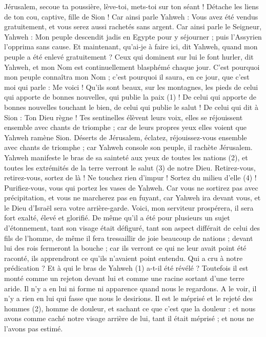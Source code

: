 \begin{multicols}{2}
{Jérusalem, secoue ta poussière, lève-toi, mets-toi sur ton séant ! Détache les liens de ton cou, captive, fille de Sion !
Car ainsi parle Yahweh : Vous avez été vendus gratuitement, et vous serez aussi rachetés sans argent.
Car ainsi parle le Seigneur, Yahweh : Mon peuple descendit jadis en Egypte pour y séjourner ; puis l’Assyrien l’opprima sans cause.
Et maintenant, qu'ai-je à faire ici, dit Yahweh, quand mon peuple a été enlevé gratuitement ? Ceux qui dominent sur lui le font hurler, dit Yahweh, et mon Nom est continuellement blasphémé chaque jour.
C'est pourquoi mon peuple connaîtra mon Nom ; c'est pourquoi il saura, en ce jour, que c'est moi qui parle : Me voici !
Qu’ils sont beaux, sur les montagnes, les pieds de celui qui apporte de bonnes nouvelles, qui publie la paix (1) ! De celui qui apporte de bonnes nouvelles touchant le bien, de celui qui publie le salut ! De celui qui dit à Sion : Ton Dieu règne !
Tes sentinelles élèvent leurs voix, elles se réjouissent ensemble avec chants de triomphe ; car de leurs propres yeux elles voient que Yahweh ramène Sion.
Déserts de Jérusalem, éclatez, réjouissez-vous ensemble avec chants de triomphe ; car Yahweh console son peuple, il rachète Jérusalem.
Yahweh manifeste le bras de sa sainteté aux yeux de toutes les nations (2), et toutes les extrémités de la terre verront le salut (3) de notre Dieu.
Retirez-vous, retirez-vous, sortez de là ! Ne touchez rien d’impur ! Sortez du milieu d'elle (4) ! Purifiez-vous, vous qui portez les vases de Yahweh.
Car vous ne sortirez pas avec précipitation, et vous ne marcherez pas en fuyant, car Yahweh ira devant vous, et le Dieu d'Israël sera votre arrière-garde.
Voici, mon serviteur prospérera, il sera fort exalté, élevé et glorifié.
De même qu’il a été pour plusieurs un sujet d’étonnement, tant son visage était défiguré, tant son aspect différait de celui des fils de l’homme,
de même il fera tressaillir de joie beaucoup de nations ; devant lui des rois fermeront la bouche ; car ils verront ce qui ne leur avait point été raconté, ils apprendront ce qu’ils n’avaient point entendu.
\VerseOne{}Qui a cru à notre prédication ? Et à qui le bras de Yahweh (1) a-t-il été révélé ?
Toutefois il est monté comme un rejeton devant lui et comme une racine sortant d'une terre aride. Il n’y a en lui ni forme ni apparence quand nous le regardons. A le voir, il n'y a rien en lui qui fasse que nous le desirions.
Il est le méprisé et le rejeté des hommes (2), homme de douleur, et sachant ce que c'est que la douleur : et nous avons comme caché notre visage arrière de lui, tant il était méprisé ; et nous ne l'avons pas estimé.
}
\end{multicols}
